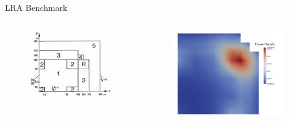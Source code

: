 \documentclass[8pt,xcolor=dvipnames]{beamer}
\begin{document}
\begin{frame}{LRA Benchmark}
\begin{columns}

\begin{figure}
\includegraphics[width=\linewidth]{figures/lra_geom.png}
\end{figure}

\begin{figure}
\includegraphics[width=\linewidth]{figures/lra_viz.png}
\end{figure}

\end{columns}
\end{frame}
\end{document}
